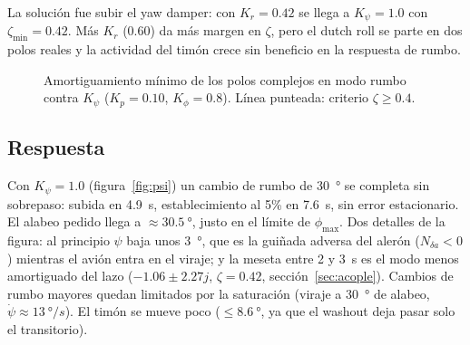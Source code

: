 \documentclass[11pt,a4paper]{article}
\begin{document}
La solución fue subir el yaw damper: con $K_r = 0.42$ se llega a
$K_\psi = 1.0$ con $\zeta_{\min} = 0.42$. Más $K_r$ (0.60) da más margen en
$\zeta$, pero el dutch roll se parte en dos polos reales y la actividad del
timón crece sin beneficio en la respuesta de rumbo.

\begin{figure}[htbp]
\centering
{}
\caption{Amortiguamiento mínimo de los polos complejos en modo rumbo contra
$K_\psi$ ($K_p = 0.10$, $K_\phi = 0.8$). Línea punteada: criterio
$\zeta \ge 0.4$.}
\label{fig:acople}
\end{figure}

\subsection{Respuesta}

Con $K_\psi = 1.0$ (figura~\ref{fig:psi}) un cambio de rumbo de
\SI{30}{\degree} se completa sin sobrepaso: subida en \SI{4.9}{s},
establecimiento al 5\% en \SI{7.6}{s}, sin error estacionario. El alabeo
pedido llega a $\approx\SI{30.5}{\degree}$, justo en el límite de
$\phi_{\max}$. Dos detalles de la figura: al principio $\psi$ baja unos
\SI{3}{\degree}, que es la guiñada adversa del alerón ($N_{\delta a} < 0$)
mientras el avión entra en el viraje; y la meseta entre 2 y \SI{3}{s} es el
modo menos amortiguado del lazo ($-1.06 \pm 2.27j$, $\zeta = 0.42$,
sección~\ref{sec:acople}). Cambios de rumbo mayores quedan limitados por la saturación
(viraje a \SI{30}{\degree} de alabeo, $\dot\psi \approx \SI{13}{\degree/s}$). El
timón se mueve poco ($\le \SI{8.6}{\degree}$, ya que el washout deja pasar solo
el transitorio).
\end{document}
